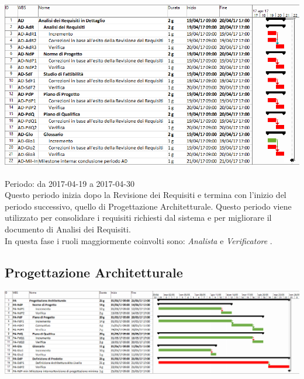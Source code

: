 \begin{center}
  \includegraphics[scale=0.3]{img/2-AD.png}
\end{center}

Periodo: da 2017-04-19 a 2017-04-30 \\
Questo periodo inizia dopo la Revisione dei Requisiti e termina con l’inizio del periodo
successivo, quello di Progettazione Architetturale.
Questo periodo viene utilizzato per consolidare i requisiti richiesti dal sistema e per
migliorare il documento di Analisi dei Requisiti.\\
In questa fase i ruoli maggiormente coinvolti sono:  \emph{Analista}  e  \emph{Verificatore} .

\subsection{Progettazione Architetturale}

\begin{center}
  \includegraphics[scale=0.25]{img/3-PA.png}
\end{center}

